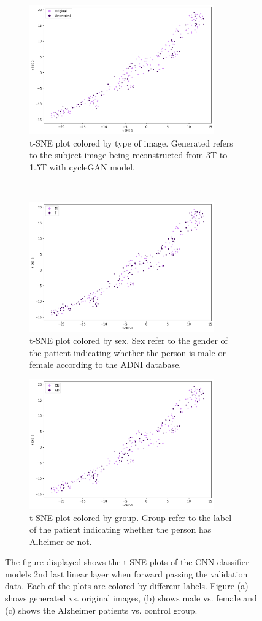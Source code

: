 \documentclass[12pt, fleqn, titlepage]{article}
\newcommand{\1}[1]{\mathds{1}\left[#1\right]}
\begin{document}
\begin{figure}[H]
	\centering
	\begin{subfigure}[t]{0.59\textwidth}
		\centering
		\includegraphics[height=2.2in]{imgs/classifier/with_generated_imgs_tsne_type}%
		\caption{t-SNE plot colored by type of image. Generated refers to the subject image being reconstructed from 3T to 1.5T with cycleGAN model.}
	\end{subfigure}%
	~
	\begin{subfigure}[t]{0.5\textwidth}
		\centering
		\includegraphics[height=2.2in]{imgs/classifier/with_generated_imgs_tsne_sex}%
		\caption{t-SNE plot colored by sex. Sex refer to the gender of the patient indicating whether the person is male or female according to the ADNI database.}	
	\end{subfigure}
	\begin{subfigure}[t]{0.5\textwidth}
	\centering
	\includegraphics[height=2.2in]{imgs/classifier/with_generated_imgs_tsne_group}%
	\caption{t-SNE plot colored by group. Group refer to the label of the patient indicating whether the person has Alheimer or not.}
	\end{subfigure}
	\label{fig:type_1}
	\caption{The figure displayed shows the t-SNE plots of the CNN classifier models 2nd last linear layer when forward passing the validation data. Each of the plots are colored by different labels. Figure (a) shows generated vs. original images, (b) shows male vs. female and (c) shows the Alzheimer patients vs. control group. }
\end{figure}
\end{document}
